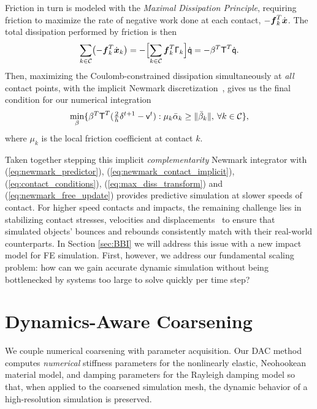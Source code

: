 Friction in turn is modeled with the {\em Maximal Dissipation Principle}, requiring friction to maximize the rate of negative work done at each contact, $- \mbox{$\bm{f}$}_k^T \dot{\mbox{$\bm{x}$}}$. The total dissipation performed by friction is then 
\begin{align}
\sum_{k \in \mathcal{C}} \bigl(- \mbox{$\bm{f}$}_k^T \dot{\mbox{$\bm{x}$}}_k \bigr) =  -\Bigl[\sum_{k \in \mathcal{C}} \mbox{$\bm{f}$}_k^T  \mbox{\textbf{{$\mathsf \Gamma$}}}_k \Bigr] \dot{\mbox{\textbf{{$\mathsf q$}}}} =  - \beta^T \mbox{\textbf{{$\mathsf T$}}}^T \dot{\mbox{\textbf{{$\mathsf q$}}}}.
\end{align}
Then, maximizing the Coulomb-constrained dissipation simultaneously at \emph{all} contact points, with the implicit Newmark discretization~\cite{Pandolfi:2002ik}, gives us the final condition for our numerical integration
\begin{align}
\begin{split}
\min_{\beta} \{ \beta^T \mbox{\textbf{{$\mathsf T$}}}^T (\tfrac{2}{h} \delta^{t+1} - \mbox{\textbf{{$\mathsf v$}}}^t) : \mu_k \bar{\alpha}_k \geq \|\bar{\beta}_k\|, \> \forall k \in \mathcal{C} \},
\label{eq:max_diss_transform}
\end{split}
\end{align}
where $\mu_k$ is the local friction coefficient at contact $k$.

Taken together stepping this implicit \emph{complementarity} Newmark integrator with (\ref{eq:newmark_predictor}), (\ref{eq:newmark_contact_implicit}), (\ref{eq:contact_conditions}), (\ref{eq:max_diss_transform}) and (\ref{eq:newmark_free_update}) provides predictive simulation at slower speeds of contact. For higher speed contacts and impacts, the remaining challenge lies in stabilizing contact stresses, velocities and displacements~\cite{Deuflhard:2008fu} to ensure that simulated objects' bounces and rebounds consistently match with their real-world counterparts. 
In Section \ref{sec:BBI} we will address this issue with a new impact model for FE simulation. First, however, we address our fundamental scaling problem: how can we gain 
accurate dynamic simulation without being bottlenecked by systems too large to solve quickly per time step?
\section{Dynamics-Aware Coarsening}
\label{sec:DAC}
We couple numerical coarsening with parameter acquisition.
Our DAC method computes \emph{numerical} stiffness parameters for the nonlinearly elastic, Neohookean material model, and damping parameters for the Rayleigh damping model so that, when applied to the coarsened simulation mesh, the dynamic behavior of a high-resolution simulation is preserved.

